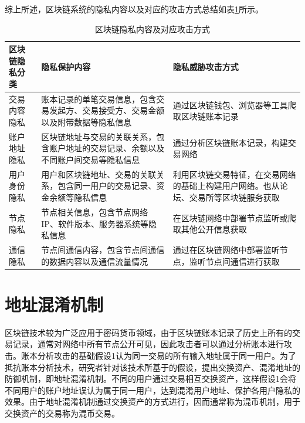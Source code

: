 综上所述，区块链系统的隐私内容以及对应的攻击方式总结如表\ref{tab:privacy}所示。

\begin{table}[htbp]
	\centering  %
	\caption{区块链隐私内容及对应攻击方式}  %
	\label{tab:privacy}  %
	\begin{tabular}{|p{3cm}<{\centering}|p{5cm}<{\centering}|p{5cm}<{\centering}|}  
		\hline  %
		区块链隐私分类 & 隐私保护内容 & 隐私威胁攻击方式 \\  %
		\hline
		交易内容隐私 & 账本记录的单笔交易信息，包含交易发起方、交易接受方、交易金额以及附带数据等隐私信息 & 通过区块链钱包、浏览器等工具爬取区块链账本记录 \\
		\hline
		账户地址隐私 & 区块链地址与交易的关联关系，包含账户地址的交易记录、余额以及不同账户间交易等隐私信息 & 通过分析区块链账本记录，构建交易网络 \\ 
		\hline
		用户身份隐私 & 用户和区块链地址、交易的关联关系，包含同一用户的交易记录、资金余额等隐私信息 & 利用区块链交易特征，在交易网络的基础上构建用户网络。也从论坛、交易所等区块链服务获取 \\ 
		\hline
		节点隐私 & 节点相关信息，包含节点网络IP、软件版本、服务器系统等隐私信息 & 在区块链网络中部署节点监听或爬取其他公开信息获取 \\
		\hline
		通信隐私 & 节点间通信内容，包含节点间通信的数据内容以及通信流量情况 & 通过在区块链网络中部署监听节点，监听节点间通信进行获取 \\
		\hline
	\end{tabular}
\end{table}

\section{地址混淆机制}

区块链技术较为广泛应用于密码货币领域，由于区块链账本记录了历史上所有的交易记录，通常对网络中所有节点公开可见，因此攻击者可以通过分析账本进行攻击。账本分析攻击的基础假设1认为同一交易的所有输入地址属于同一用户。为了抵抗账本分析技术，研究者针对该技术所基于的假设，提出交换资产、混淆地址的防御机制，即地址混淆机制。不同的用户通过交易相互交换资产，这样假设1会将不同用户的账户地址误认为属于同一用户，达到混淆用户地址、保护各用户隐私的效果。由于地址混淆机制通过交换资产的方式进行，因而通常称为混币机制，用于交换资产的交易称为混币交易。

